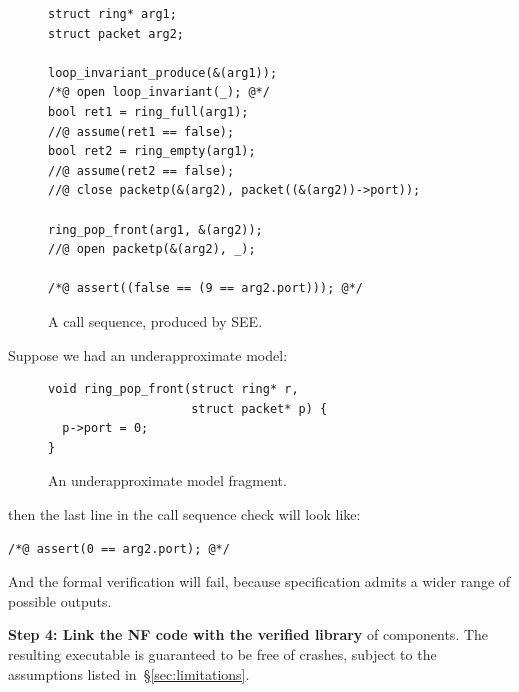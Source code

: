 \documentclass[letterpaper,twocolumn,10pt]{article}
\newcommand{\code}[1]{\lstinline{#1}}
\begin{document}
\begin{figure}[h!]
\begin{lstlisting}
struct ring* arg1;
struct packet arg2;

loop_invariant_produce(&(arg1));
/*@ open loop_invariant(_); @*/
bool ret1 = ring_full(arg1);
//@ assume(ret1 == false);
bool ret2 = ring_empty(arg1);
//@ assume(ret2 == false);
//@ close packetp(&(arg2), packet((&(arg2))->port));

ring_pop_front(arg1, &(arg2));
//@ open packetp(&(arg2), _);

/*@ assert((false == (9 == arg2.port))); @*/
\end{lstlisting}
  \caption{A call sequence, produced by SEE.}
  \label{lst:call-sequence}
\end{figure}

Suppose we had an underapproximate model:
\begin{figure}[h!]
\begin{lstlisting}
void ring_pop_front(struct ring* r,
                    struct packet* p) {
  p->port = 0;
}
\end{lstlisting}
  \caption{An underapproximate model fragment.}
  \label{lst:underapproximate}
\end{figure}
then the last line in the call sequence check will look like:
\begin{lstlisting}
/*@ assert(0 == arg2.port); @*/
\end{lstlisting}
And the formal verification will fail, because specification admits a wider
range of possible outputs.

{\bf Step 4: Link the NF code with the verified library} of components. The
resulting executable is guaranteed to be free of crashes, subject to the
assumptions listed in~\S\ref{sec:limitations}.

\end{document}

